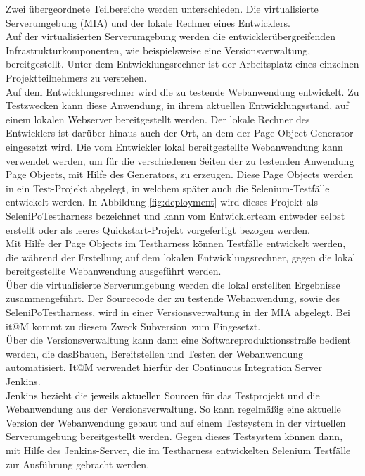 Zwei übergeordnete Teilbereiche werden unterschieden. Die virtualisierte Serverumgebung (MIA) und der lokale Rechner eines Entwicklers.\\
Auf der virtualisierten Serverumgebung werden die entwicklerübergreifenden Infrastrukturkomponenten, wie beispielsweise eine Versionsverwaltung, bereitgestellt. Unter dem Entwicklungsrechner ist der Arbeitsplatz eines einzelnen Projektteilnehmers zu verstehen.\\
Auf dem Entwicklungsrechner wird die zu testende Webanwendung entwickelt. Zu Testzwecken kann diese Anwendung, in ihrem aktuellen Entwicklungsstand, auf einem lokalen Webserver bereitgestellt werden.
Der lokale Rechner des Entwicklers ist darüber hinaus auch der Ort, an dem der Page Object Generator eingesetzt wird. Die vom Entwickler lokal bereitgestellte Webanwendung kann verwendet werden, um für die verschiedenen Seiten der zu testenden Anwendung Page Objects, mit Hilfe des Generators, zu erzeugen. Diese Page Objects werden in ein Test-Projekt abgelegt, in welchem später auch die Selenium-Testfälle entwickelt werden. In Abbildung \ref{fig:deployment} wird dieses Projekt als SeleniPoTestharness bezeichnet und kann vom Entwicklerteam entweder selbst erstellt oder als leeres Quickstart-Projekt vorgefertigt bezogen werden.\\ 
Mit Hilfe der Page Objects im Testharness können Testfälle entwickelt werden, die während der Erstellung auf dem lokalen Entwicklungsrechner, gegen die lokal bereitgestellte Webanwendung ausgeführt werden.\\
Über die virtualisierte Serverumgebung werden die lokal erstellten Ergebnisse zusammengeführt. 
Der Sourcecode der zu testende Webanwendung, sowie des SeleniPoTestharness, wird in einer Versionsverwaltung in der MIA abgelegt. Bei it@M kommt zu diesem Zweck \grq Subversion\grq\ zum Eingesetzt.\\
Über die Versionsverwaltung kann dann eine Softwareproduktionsstraße bedient werden, die dasBbauen, Bereitstellen und Testen der Webanwendung automatisiert. It@M verwendet hierfür der Continuous Integration Server \grq Jenkins\grq.\\
Jenkins bezieht die jeweils aktuellen Sourcen für das Testprojekt und die Webanwendung aus der Versionsverwaltung. So kann regelmäßig eine aktuelle Version der Webanwendung gebaut und auf einem Testsystem in der virtuellen Serverumgebung bereitgestellt werden. Gegen dieses Testsystem können dann, mit Hilfe des Jenkins-Server, die im Testharness entwickelten Selenium Testfälle zur Ausführung gebracht werden.



